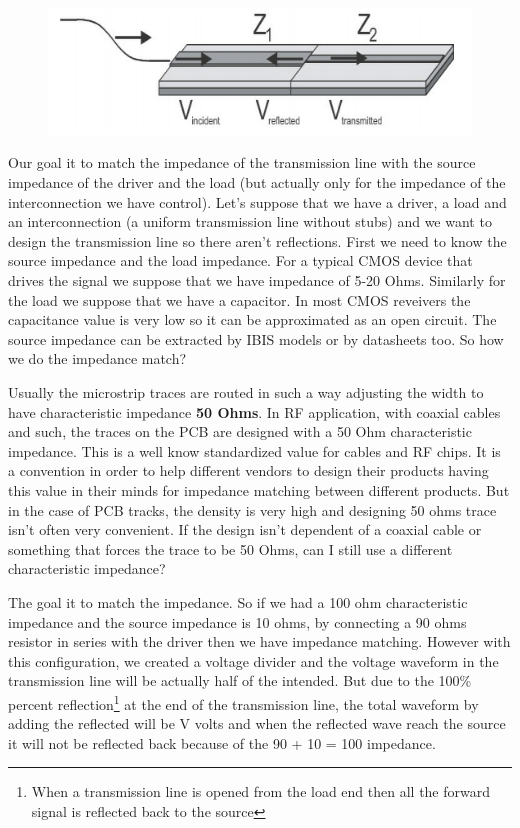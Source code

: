 \documentclass[final]{cubedoc}
\begin{document}
	
	\begin{figure}[h!]
		\centering
		\includegraphics[width = .8\textwidth, keepaspectratio, height=.25\textheight]{assets/impedance_matching.png}
		\caption{\cite{bogatin2009signal}}
	\end{figure}
	
	Our goal it to match the impedance of the transmission line with the source impedance of the driver and the load (but actually only for the impedance of the interconnection we have control). Let's suppose that we have a driver, a load and an interconnection (a uniform transmission line without stubs) and we want to design the transmission line so there aren't reflections. First we need to know the source impedance and the load impedance. For a typical CMOS device that drives the signal we suppose that we have impedance of 5-20 Ohms. Similarly for the load we suppose that we have a capacitor. In most CMOS reveivers the capacitance value is very low so it can be approximated as an open circuit. The source impedance can be extracted by IBIS models or by datasheets too. So how we do the impedance match? 
	
	Usually the microstrip traces are routed in such a way adjusting the width to have characteristic impedance \textbf{50 Ohms}. In RF application, with coaxial cables and such, the traces on the PCB are designed with a 50 Ohm characteristic impedance. This is a well know standardized value for cables and RF chips. It is a convention in order to help different vendors to design their products having this value in their minds for impedance matching between different products. But in the case of PCB tracks, the density is very high and designing 50 ohms trace isn't often very convenient. If the design isn't dependent of a coaxial cable or something that forces the trace to be 50 Ohms, can I still use a different characteristic impedance?
	
	The goal it to match the impedance. So if we had a 100 ohm characteristic impedance and the source impedance is 10 ohms, by connecting a 90 ohms resistor in series with the driver then we have impedance matching. However with this configuration, we created a voltage divider and the voltage waveform in the transmission line will be actually half of the intended. But due to the 100\% percent reflection\footnote{When a transmission line is opened from the load end then all the forward signal is reflected back to the source} at the end of the transmission line, the total waveform by adding the reflected will be V volts and when the reflected wave reach the source it will not be reflected back because of the 90 + 10 = 100 impedance.
	
\end{document}
